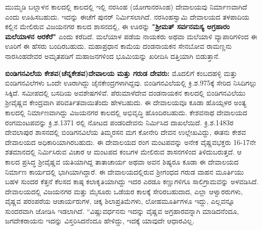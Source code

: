 ಮುಮ್ಮಡಿ ಬಲ್ಲಾಳನ ಕಾಲದಲ್ಲಿ ಕಾಲದಲ್ಲಿ ಇಲ್ಲಿ ನರಸಿಂಹ (ಯೋಗಾನರಸಿಂಹ) ದೇವಾಲಯವು ನಿರ್ಮಾಣವಾಗಿದೆ ಎಂದು ಊಹಿಸಬಹುದು. ಇದನ್ನು ಈಚೆಗೆ ಪುನರ್​ ನಿರ್ಮಿಸಲಾಗಿದೆ. ನರಸಿಂಹಸ್ವಾಮಿ ದೇವಾಲಯದ ತಳಪಾದಿಯ ಕಲ್ಲಿನ ಮೇಲಿರುವ ವಿಜಯನಗರ ಕಾಲದ ಶಾಸನದಲ್ಲಿ, ಈ ಊರನ್ನು \textbf{"ಶ‍್ರೀಮತ್​ ಸರ್ವನಮಸ್ಯ ಅಗ್ರಹಾರಂ ಮಲೆಯಾಳನ ಅರಕೆರೆ"} ಎಂದು ಕರೆದಿದೆ. ಮಲೆಯಾಳ ಪಡೆಯ ನಾಯಕರು ಅಥವಾ ಮಲೆಯಾಳಿ ವ್ಯಾಪಾರಿಗಳಿಂದ ಈ ಊರಿಗೆ ಈ ಹೆಸರು ಬಂದಿರಬಹುದು. ಮಹಾಪ್ರಧಾನ ಕಾಮೆಯ ದಂಡನಾಯಕನ ಸೇನಬೋವ ರಾಮಣ್ಣನು ನಾರಸಿಂಹದೇವರ ಅಮೃತಪಡಿಗೆ ಮಹಾಜನಗಳಿಂದ ಭೂಮಿಯನ್ನು ಖರೀದಿಸಿ ದತ್ತಿಯಾಗಿ ಬಿಡುತ್ತಾನೆ.

\textbf{ಬಿಂಡಿಗನವಿಲೆಯ ಕೇಶವ(ಚೆನ್ನಕೇಶವ)ದೇವಾಲಯ ಮತ್ತು ಗರುಡ ದೇವರು:} ಮೊದಲಿಗೆ ಕಂಬದಹಳ್ಳಿ ಮತ್ತು ಬಿಂಡಿಗನವಿಲೆಗಳು ಒಂದೇ ಊರಾಗಿದ್ದು ಜೈನಕೇಂದ್ರಗಳಾಗಿದ್ದವು. ಬಿಂಡಿಗನವಿಲೆಯಲ್ಲಿ ಕ್ರಿ.ಶ.975ಕ್ಕೆ ಸೇರಿದ ನಿಸಿದಿಗಲ್ಲು ಸಿಕ್ಕಿದೆ. ಸಮೀಪದಲ್ಲಿ ಬಸದಿಯ ಅವಶೇಷಗಳಿವೆ. ಪೆರುಮಾಳೆದೇವ ದಂಡನಾಯಕನ ಕಾಲದಲ್ಲಿ ಬಿಂಡಿಗನವಿಲೆಯು ಶ‍್ರೀವೈಷ್ಣವ ಕೇಂದ್ರವಾಗಿ ಪರಿವರ್ತಿತವಾಯಿತೆಂದು ಹೇಳಬಹುದು. ಈ ದೇವಾಲಯವೂ ಕೂಡಾ ಹೊಯ್ಸಳರ ಅಂತ್ಯ ಕಾಲದಲ್ಲಿ ನಿರ್ಮಾಣವಾಗಿದ್ದು ವಿಜಯನಗರ ಕಾಲದಲ್ಲಿ ಅಭಿವೃದ್ಧಿ ಹೊಂದಿರಬಹುದು. ಕೇಶವನಾಥ ದೇವಾಲಯದ ರಂಗಮಂಟಪವನ್ನು ಕ್ರಿ.ಶ.1371 ರಲ್ಲಿ ನೋಟದ ಪಂಡರಿದೇವನು ನಿರ್ಮಿಸಿದ ದಾಖಲೆಯಿದೆ. ಕ್ರಿ.ಶ.1483ರ ದೇವಲಾಪುರ ಶಾಸನದಲ್ಲಿ ಬಿಂಡಿಗನವಿಲೆಯ ತಿಮ್ಮರಸನ ಮಗ ಕೋನೇರಿ ದೇವನ ಉಲ್ಲೇಖವಿದ್ದು, ಈತನು ಕೇಶವ ದೇವಾಲಯದ ಅಧಿಕಾರಿಯಾಗಿರಬಹುದು. ಈ ದೇವಾಲಯದ ರಂಗ ಮಂಟಪವನ್ನು ಅನೇಕ ವೈಷ್ಣವಭಕ್ತರು 16-17ನೇ ಶತಮಾನದಲ್ಲಿ ನಿರ್ಮಿಸಿರುವ ವಿಚಾರ ಆ ಮಂಟಪದ ಕಂಬಗಳ ಮೇಲಿರುವ ಶಾಸನಗಳಿಂದ ತಿಳಿದುಬರುತ್ತದೆ. ಆ ಕಾಲದ ಪ್ರಸಿದ್ಧ ಶ‍್ರೀವೈಷ್ಣವ ಯತಿಯಾಗಿದ್ದ ತಾತಾಚಾರ್ಯ ಅಥವಾ ಅವನ ಶಿಷ್ಯರೂ ಕೂಡಾ ಈ ದೇವಾಲಯದ ನಿರ್ಮಾಣ ಕಾರ್ಯದಲ್ಲಿ ಭಾಗಿಯಾಗಿದ್ದಾರೆ. ಈ ದೇವಾಲಯದಲ್ಲಿರುವ ಶ‍್ರೀಗಂಧದ ಗರುಡ ವಾಹನ ಮೂರ್ತಿಯು ಬಹಳ ಸುಂದರ ಕೆತ್ತನೆ ಕೆಲಸದ ಕಾಷ್ಠ ಕಲಾಕೃತಿಯಾಗಿದ್ದು ಇದರ ಎರಡೂ ಕಣ್ಣುಗಳಿಗೂ ಸಾಲಿಗ್ರಾಮವನ್ನು ಅಳವಡಿಸಿದೆ. ದೇವಾಲಯದಲ್ಲಿ ವಿಜಯನಗರ ಮತ್ತು ಮೈಸೂರು ಒಡೆಯರ ಕಾಲಕ್ಕೆ ಸೇರಿರಬಹುದಾದ, ಎಲ್ಲಾ ಆಳ್ವಾರರುಗಳು, ವೈಷ್ಣವ ಪರಂಪರೆಯ ಆಚಾರ್ಯರುಗಳ, ಚಿಕ್ಕ ಶಿಲಾಪ್ರತಿಮೆಗಳು, ಲೋಹಮೂರ್ತಿಗಳೂ ಇದ್ದು, ಎಲ್ಲವನ್ನೂ ಸುಂದರವಾಗಿ ಜೋಡಿಸಿ ಇಡಲಾಗಿದೆ. “ವಿಷ್ಣುವರ್ಧನನು ಇದನ್ನು ವೈಷ್ಣವ ಅಗ್ರಹಾರವನ್ನಾಗಿ ಮಾಡಿದನೆಂದೂ, ಜಗದೇಕರಾಯನು ಇದನ್ನು ವಿಸ್ತರಿಸಿದನೆಂದೂ ಹೇಳಿದ್ದು, ಇದಕ್ಕೆ ಯಾವುದೇ ಆಧಾರವಿಲ್ಲ.

